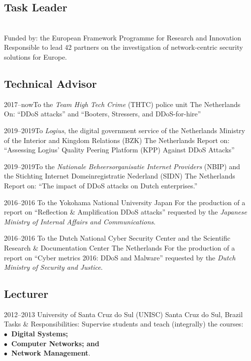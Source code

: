 \documentclass[print]{styles/friggeri-cv-mac} %
\begin{document}
\subsection{Task Leader}\vspace{-5pt}
\begin{entrylist}
{\\Funded by: the European Framework Programme for Research and Innovation}
{Responsible to lead 42 partners on the investigation of network-centric security solutions for Europe.}%
\end{entrylist}
\subsection{Technical Advisor}\vspace{-5pt}
\begin{entrylist}

\entry
{2017--now}{To the \textit{Team High Tech Crime} (THTC) police unit}
{The Netherlands}
{On: ``DDoS attacks'' and ``Booters, Stressers, and DDoS-for-hire''}

\entry
{2019--2019}{To \textit{Logius}, the digital government service of the Netherlands Ministry of the Interior and Kingdom Relations (BZK)}
{The Netherlands}
{Report on: ``Assessing Logius' Quality Peering Platform (KPP) Against DDoS Attacks''}

\entry
{2019--2019}{To the \textit{Nationale Beheersorganisatie Internet Providers} (NBIP) and the Stichting Internet Domeinregistratie Nederland (SIDN)}
{The Netherlands}
{Report on: ``The impact of DDoS attacks on Dutch enterprises.''}
	
\entry
{2016--2016}
{To the Yokohama National University}
{Japan}
{For the production of a report on ``Reflection \& Amplification DDoS attacks''
requested by the \emph{Japanese Ministry of Internal Affairs and
Communications}.}

\entry
{2016--2016}
{To the Dutch National Cyber Security Center and the Scientific Research \& Documentation Center}
{The Netherlands}
{For the production of a report on ``Cyber metrics 2016: DDoS and Malware'' requested by the \emph{Dutch Ministry of Security and Justice}.} 

\end{entrylist}



\subsection{Lecturer}\vspace{-5pt}
\begin{entrylist}
\entry
{2012--2013}
{University of Santa Cruz do Sul (UNISC)}
{Santa Cruz do Sul, Brazil}
{Tasks \& Responsibilities: Supervise students and teach (integrally) the courses: \\
	\textbf{$\bullet$~Digital Systems;\\$\bullet$~Computer Networks; and\\$\bullet$~Network Management}.} 
\end{entrylist}
\end{document}
